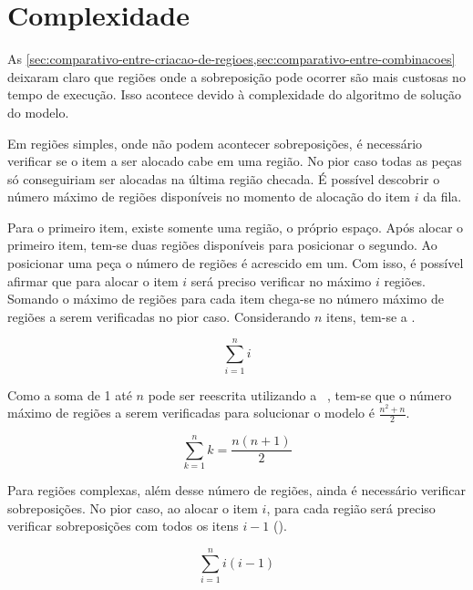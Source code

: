 \section{Complexidade}\label{sec:complexidade}

As \cref{sec:comparativo-entre-criacao-de-regioes,sec:comparativo-entre-combinacoes} deixaram claro
que regiões onde a sobreposição pode ocorrer são mais custosas no tempo de execução.
Isso acontece devido à complexidade do algoritmo de solução do modelo.

Em regiões simples, onde não podem acontecer sobreposições, é necessário verificar se o item a ser
alocado cabe em uma região.
No pior caso todas as peças só conseguiriam ser alocadas na última região checada.
É possível descobrir o número máximo de regiões disponíveis no momento de alocação do item $i$ da
fila.

Para o primeiro item, existe somente uma região, o próprio espaço.
Após alocar o primeiro item, tem-se duas regiões disponíveis para posicionar o segundo.
Ao posicionar uma peça o número de regiões é acrescido em um.
Com isso, é possível afirmar que para alocar o item $i$ será preciso verificar no máximo $i$ regiões.
Somando o máximo de regiões para cada item chega-se no número máximo de regiões a serem verificadas
no pior caso.
Considerando $n$ itens, tem-se a .

\begin{equation}
    \label{eq:sum-1-to-n}
    \sum_{i=1}^{n} i
\end{equation}

Como a soma de 1 até $n$ pode ser reescrita utilizando a 
~\cite{merca2015alternative}, tem-se que o número máximo de regiões a serem verificadas
para solucionar o modelo é $\frac{n^2 + n}{2}$.

\begin{equation}
    \label{eq:formula-sum-1-to-n}
    \sum_{k=1}^{n} k = \dfrac{n(n+1)}{2}
\end{equation}

Para regiões complexas, além desse número de regiões, ainda é necessário verificar sobreposições.
No pior caso, ao alocar o item $i$, para cada região será preciso verificar sobreposições com
todos os itens $i - 1$ ().

\begin{equation}
    \label{eq:sum-i-pow-2}
    \sum_{i=1}^{n} i (i - 1)
\end{equation}

